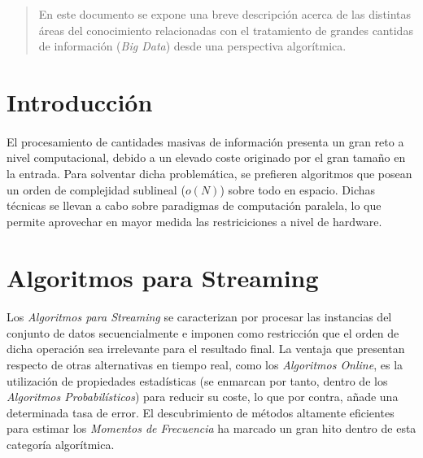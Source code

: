 \documentclass[a4paper]{article}
\begin{document}
  \maketitle %



  	\begin{abstract}
  		\noindent En este documento se expone una breve descripción acerca de las distintas áreas del conocimiento relacionadas con el tratamiento de grandes cantidas de información (\emph{Big Data}) desde una perspectiva algorítmica.
  	\end{abstract}


  \section{Introducción}

    \paragraph{}
    El procesamiento de cantidades masivas de información presenta un gran reto a nivel computacional, debido a un elevado coste originado por el gran tamaño en la entrada. Para solventar dicha problemática, se prefieren algoritmos que posean un orden de complejidad sublineal ($o(N)$) sobre todo en espacio. Dichas técnicas se llevan a cabo sobre paradigmas de computación paralela, lo que permite aprovechar en mayor medida las restriciciones a nivel de hardware.

  \section{Algoritmos para Streaming}

    \paragraph{}
    Los \emph{Algoritmos para Streaming} se caracterizan por procesar las instancias del conjunto de datos secuencialmente e imponen como restricción que el orden de dicha operación sea irrelevante para el resultado final. La ventaja que presentan respecto de otras alternativas en tiempo real, como los \emph{Algoritmos Online}, es la utilización de propiedades estadísticas (se enmarcan por tanto, dentro de los \emph{Algoritmos Probabilísticos}) para reducir su coste, lo que por contra, añade una determinada tasa de error. El descubrimiento de métodos altamente eficientes para estimar los \emph{Momentos de Frecuencia} ha marcado un gran hito dentro de esta categoría algorítmica.
\end{document}
